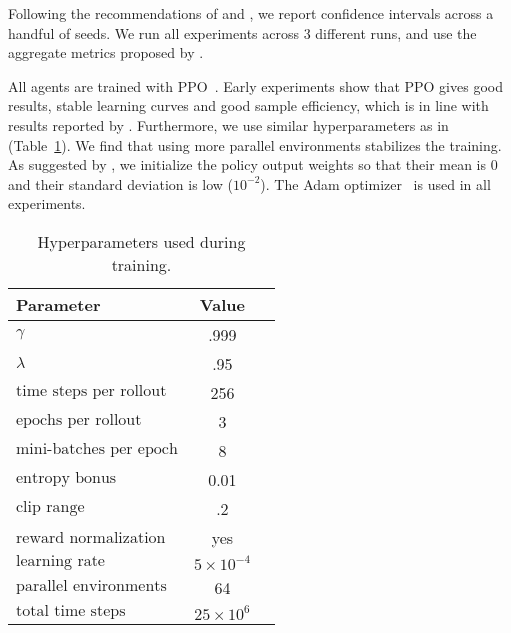 Following the recommendations of \cite{henderson_matters_2018} and \cite{agarwal_rlliable_2022}, we report confidence intervals across a handful of seeds.
We run all experiments across 3 different runs, and use the aggregate metrics proposed by \cite{agarwal_rlliable_2022}.

All agents are trained with PPO~\cite{schulman_ppo_2017}.
Early experiments show that PPO gives good results, stable learning curves and good sample efficiency, which is in line with results reported by \cite{andrychowicz_empirical_2020}.
Furthermore, we use similar hyperparameters as in \cite{cobbe_procgen_2020} (Table~\ref{tab:hyperparameters}).
We find that using more parallel environments stabilizes the training.
As suggested by \cite{andrychowicz_empirical_2020}, we initialize the policy output weights so that their mean is 0 and their standard deviation is low (\(10^{-2}\)).
The Adam optimizer~\cite{kingma_ba_2017} is used in all experiments.

\begin{table}
    \centering
    \caption{Hyperparameters used during training.}
    \begin{tabular}{lcc}
        \toprule
        \textbf{Parameter} & \textbf{Value} \\
        \midrule
        \(\gamma\) & .999 \\
        \(\lambda\) & .95 \\
        \(\text{time steps per rollout}\) & 256 \\
        \(\text{epochs per rollout}\) & 3 \\
        \(\text{mini-batches per epoch}\) & 8 \\
        \(\text{entropy bonus}\) & 0.01 \\
        \(\text{clip range}\) & .2 \\
        \(\text{reward normalization}\) & yes \\
        \(\text{learning rate}\) & \(5 \times 10^{-4}\) \\
        \(\text{parallel environments}\) & 64 \\
        \(\text{total time steps}\) & \(25 \times 10^6\) \\
        \bottomrule
    \end{tabular}
    \label{tab:hyperparameters}
\end{table}

